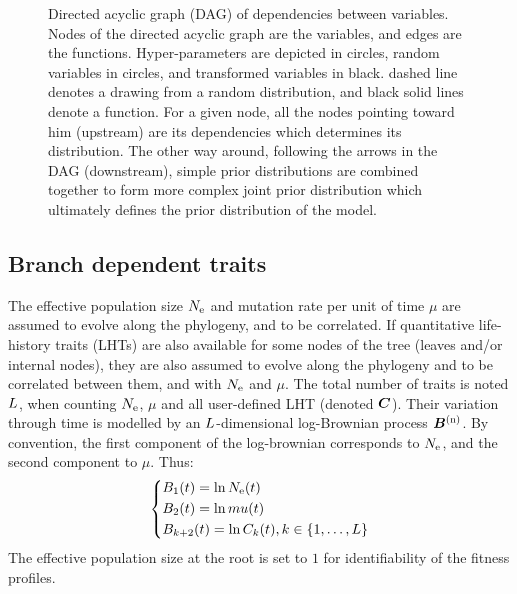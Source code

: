 \documentclass{MBE}
\begin{document}
\begin{figure}[t]
		\caption[Directed acyclic graph of dependencies between variables]{
		Directed acyclic graph (DAG) of dependencies between variables.
		Nodes of the directed acyclic graph are the variables, and edges are the functions.
		Hyper-parameters are depicted in {\color{RED}{red}} circles, random variables in {\color{BLUE}{blue}} circles, and transformed variables in black.
		{\color{BLUE}{Blue}} dashed line denotes a drawing from a random distribution, and black solid lines denote a function.
		For a given node, all the nodes pointing toward him (upstream) are its dependencies which determines its distribution.
		The other way around, following the arrows in the DAG (downstream), simple {prior} distributions are combined together to form more complex joint {prior} distribution which ultimately defines the {prior} distribution of the model.
		}\label{fig:DAG-MutSelNe}
	\end{figure}
	
	\subsection{Branch dependent traits}
	The {effective population size} $N_{\text{e}}$ and mutation rate per unit of time $\mu$ are assumed to evolve along the phylogeny, and to be correlated.
	If quantitative life-history traits ({LHT}s) are also available for some nodes of the tree (leaves and/or internal nodes), they are also assumed to evolve along the phylogeny and to be correlated between them, and with $N_{\text{e}}$ and $\mu$.
	The total number of traits is noted $L$, when counting $N_{\text{e}}$, $\mu$ and all user-defined LHT (denoted $\bm{C}$).
	Their variation through time is modelled by an $L$-dimensional log-Brownian process $\bm{B}^{(\text{n})}$.
	By convention, the first component of the log-brownian corresponds to $N_{\text{e}}$, and the second component to $\mu$.
	Thus:
	\begin{equation}
		\begin{dcases}
			B_1 (t) = \ln N_{\text{e}} (t) \\
			B_2 (t) = \ln mu (t) \\
			B_{k+2}(t) = \ln C_k(t), k \in \{1, \hdots, L\}
		\end{dcases}
	\end{equation}
	The effective population size at the root is set to $1$ for identifiability of the fitness profiles.
\end{document}
